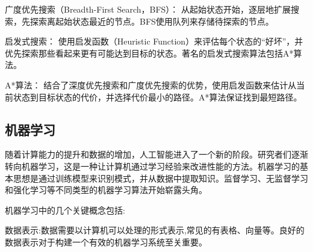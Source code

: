 广度优先搜索（Breadth-First Search，BFS）： 从起始状态开始，逐层地扩展搜索，先探索离起始状态最近的节点。BFS使用队列来存储待探索的节点。

启发式搜索： 使用启发函数（Heuristic Function）来评估每个状态的“好坏”，并优先探索那些看起来更有可能达到目标的状态。著名的启发式搜索算法包括A*算法。

A*算法： 结合了深度优先搜索和广度优先搜索的优势，使用启发函数来估计从当前状态到目标状态的代价，并选择代价最小的路径。A*算法保证找到最短路径。

\subsection{机器学习}

随着计算能力的提升和数据的增加，人工智能进入了一个新的阶段。研究者们逐渐转向机器学习，这是一种让计算机通过学习经验来改进性能的方法。机器学习的基本思想是通过训练模型来识别模式，并从数据中提取知识。监督学习、无监督学习和强化学习等不同类型的机器学习算法开始崭露头角。

机器学习中的几个关键概念包括:

数据表示:数据需要以计算机可以处理的形式表示,常见的有表格、向量等。良好的数据表示对于构建一个有效的机器学习系统至关重要。